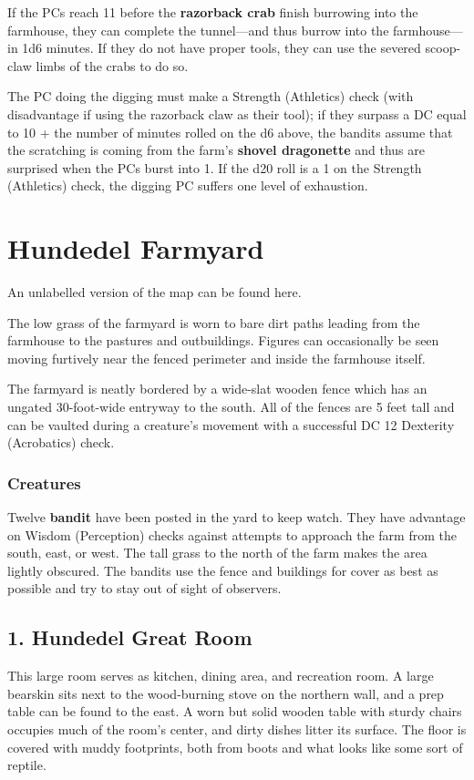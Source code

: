 \documentclass[10pt,a4paper,twoside,bg=print,twocolumn,openany,nodeprecatedcode]{dndbook}
\begin{document}
If the PCs reach 11 before the \textbf{razorback crab} finish burrowing into the farmhouse, they can complete the tunnel—and thus burrow into the farmhouse—in 1d6 minutes. If they do not have proper tools, they can use the severed scoop-claw limbs of the crabs to do so.

The PC doing the digging must make a Strength (Athletics) check (with disadvantage if using the razorback claw as their tool); if they surpass a DC equal to 10 + the number of minutes rolled on the d6 above, the bandits assume that the scratching is coming from the farm's \textbf{shovel dragonette} and thus are surprised when the PCs burst into 1. If the d20 roll is a 1 on the Strength (Athletics) check, the digging PC suffers one level of exhaustion.

\section{Hundedel Farmyard}
An unlabelled version of the map can be found here.

\begin{DndReadAloud}{}
The low grass of the farmyard is worn to bare dirt paths leading from the farmhouse to the pastures and outbuildings. Figures can occasionally be seen moving furtively near the fenced perimeter and inside the farmhouse itself.

\end{DndReadAloud}

The farmyard is neatly bordered by a wide-slat wooden fence which has an ungated 30-foot-wide entryway to the south. All of the fences are 5 feet tall and can be vaulted during a creature's movement with a successful DC 12 Dexterity (Acrobatics) check.

\subsubsection{Creatures}
Twelve \textbf{bandit} have been posted in the yard to keep watch. They have advantage on Wisdom (Perception) checks against attempts to approach the farm from the south, east, or west. The tall grass to the north of the farm makes the area lightly obscured. The bandits use the fence and buildings for cover as best as possible and try to stay out of sight of observers.

\subsection{1. Hundedel Great Room}
\begin{DndReadAloud}{}
This large room serves as kitchen, dining area, and recreation room. A large bearskin sits next to the wood-burning stove on the northern wall, and a prep table can be found to the east. A worn but solid wooden table with sturdy chairs occupies much of the room's center, and dirty dishes litter its surface. The floor is covered with muddy footprints, both from boots and what looks like some sort of reptile.

\end{DndReadAloud}
\end{document}
